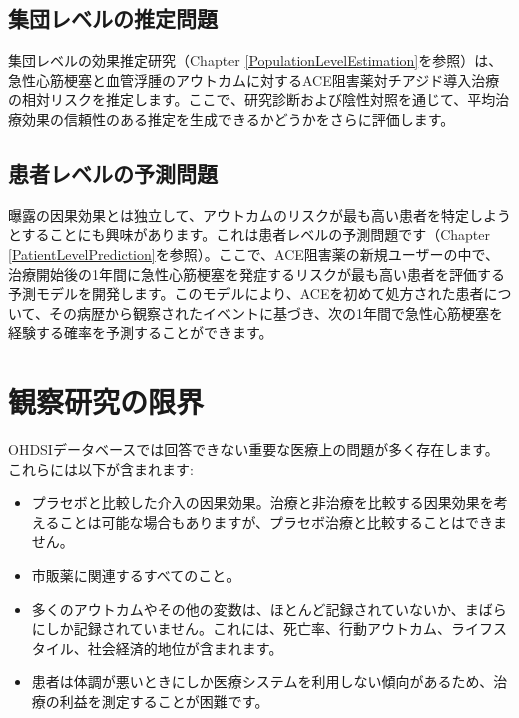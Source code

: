 \documentclass[
  11pt]{book}
\providecommand{\tightlist}{%
  \setlength{\itemsep}{0pt}\setlength{\parskip}{0pt}}
\theoremstyle{definition}
\theoremstyle{definition}
\theoremstyle{definition}
\theoremstyle{definition}
\theoremstyle{remark}
\begin{document}
\subsection{集団レベルの推定問題}\label{ux96c6ux56e3ux30ecux30d9ux30ebux306eux63a8ux5b9aux554fux984c}

集団レベルの効果推定研究（Chapter \ref{PopulationLevelEstimation}を参照）は、急性心筋梗塞と血管浮腫のアウトカムに対するACE阻害薬対チアジド導入治療の相対リスクを推定します。ここで、研究診断および陰性対照を通じて、平均治療効果の信頼性のある推定を生成できるかどうかをさらに評価します。

\subsection{患者レベルの予測問題}\label{ux60a3ux8005ux30ecux30d9ux30ebux306eux4e88ux6e2cux554fux984c}

曝露の因果効果とは独立して、アウトカムのリスクが最も高い患者を特定しようとすることにも興味があります。これは患者レベルの予測問題です（Chapter \ref{PatientLevelPrediction}を参照）。ここで、ACE阻害薬の新規ユーザーの中で、治療開始後の1年間に急性心筋梗塞を発症するリスクが最も高い患者を評価する予測モデルを開発します。このモデルにより、ACEを初めて処方された患者について、その病歴から観察されたイベントに基づき、次の1年間で急性心筋梗塞を経験する確率を予測することができます。

\section{観察研究の限界}\label{ux89b3ux5bdfux7814ux7a76ux306eux9650ux754c}


OHDSIデータベースでは回答できない重要な医療上の問題が多く存在します。これらには以下が含まれます:

\begin{itemize}
\tightlist
\item
  プラセボと比較した介入の因果効果。治療と非治療を比較する因果効果を考えることは可能な場合もありますが、プラセボ治療と比較することはできません。
\item
  市販薬に関連するすべてのこと。
\item
  多くのアウトカムやその他の変数は、ほとんど記録されていないか、まばらにしか記録されていません。これには、死亡率、行動アウトカム、ライフスタイル、社会経済的地位が含まれます。
\item
  患者は体調が悪いときにしか医療システムを利用しない傾向があるため、治療の利益を測定することが困難です。
\end{itemize}
\end{document}

